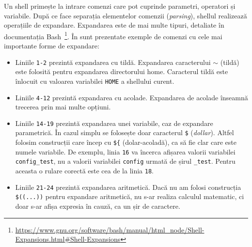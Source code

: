 Un shell primește la intrare comenzi care pot cuprinde parametri, operatori și variabile. După ce face separația elementelor comenzii (\textit{parsing}), shellul realizează operațiile de expandare. Expandarea este de mai
multe tipuri, detaliate în documentația Bash~\footnote{\url{https://www.gnu.org/software/bash/manual/html\_node/Shell-Expansions.html\#Shell-Expansions}}. În  sunt prezentate exemple de comenzi cu cele mai
importante forme de expandare:
\begin{itemize}
  \item Liniile \texttt{1-2} prezintă expandarea cu tildă. Expandarea caracterului \texttt{$\sim$} (tildă) este folosită pentru expandarea directorului home. Caracterul tildă este înlocuit cu valoarea variabilei \texttt{HOME} a shellului curent.
  \item Liniile \texttt{4-12} prezintă expandarea cu acolade.
Expandarea de acolade înseamnă trecerea prin mai multe opțiuni.
  \item Liniile \texttt{14-19} prezintă expandarea unei variabile, caz de expandare parametrică. În cazul simplu se folosește doar caracterul \texttt{\$} (\textit{dollar}). Altfel folosim construcții care încep cu \texttt{\$\{} (dolar-acoladă), ca să fie clar care este numele variabile.
    De exemplu, linia \texttt{16} va încerca afișarea valorii variabilei \texttt{config\_test}, nu a valorii variabilei \texttt{config} urmată de
    șirul \texttt{\_test}. Pentru aceasta o rulare corectă este cea de la linia \texttt{18}.
  \item Liniile \texttt{21-24} prezintă expandarea aritmetică. Dacă nu am folosi construcția \verb|$((...))| pentru expandare aritmetică, nu s-ar realiza calculul matematic, ci doar s-ar afișa expresia în cauză, ca un șir de caractere.
\end{itemize}


